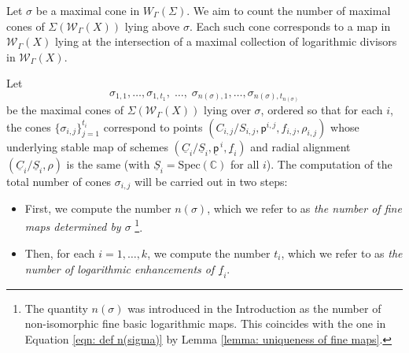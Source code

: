 \documentclass{article}
\def\WG{\mathcal{W}_{\Gamma}}
\begin{document}
Let $\sigma$ be a maximal cone in $W_{\Gamma}(\Sigma)$. We aim to count the number of maximal cones of $\Sigma(\WG(X))$ lying above $\sigma$. Each such cone corresponds to a map in $\WG(X)$ lying at the intersection of a maximal collection of logarithmic divisors in $\WG(X)$.

Let
\begin{equation}\label{eqn: def n(sigma)}
\sigma_{1,1}, \ldots, \sigma_{1,t_1}, \;\ldots,\; \sigma_{n(\sigma),1}, \ldots, \sigma_{n(\sigma),t_{n(\sigma)}}
\end{equation}
be the maximal cones of $\Sigma(\WG(X))$ lying over $\sigma$, ordered so that for each $i$, the cones $\{\sigma_{i,j}\}_{j=1}^{t_i}$ correspond to points $(C_{i,j}/S_{i,j},\mathsf{p}^{i,j}, f_{i,j}, \rho_{i,j})$ whose underlying stable map of schemes
$
(\underline{C}_i/\underline{S}_i, \underline{\mathsf{p}}^{\,i}, \underline{f}_i)
$
and radial alignment $(\underline{C}_i/\underline{S}_i, \rho)$ is the same (with $\underline{S}_i = \mathrm{Spec}(\mathbb{C})$ for all $i$). 
The computation of the total number of cones $\sigma_{i,j}$ will be carried out in two steps:
\begin{itemize}
    \item First, we compute the number $n(\sigma)$, which we refer to as \emph{the number of fine maps determined by $\sigma$} \footnote{The quantity $n(\sigma)$ was introduced in the Introduction as the number of non-isomorphic fine basic logarithmic maps. This coincides with the one in Equation \eqref{eqn: def n(sigma)} by Lemma \ref{lemma: uniqueness of fine maps}.}.
    \item Then, for each $i = 1, \ldots, k$, we compute the number $t_i$, which we refer to as \emph{the number of logarithmic enhancements of $\underline{f}_i$}.
\end{itemize}
\end{document}

